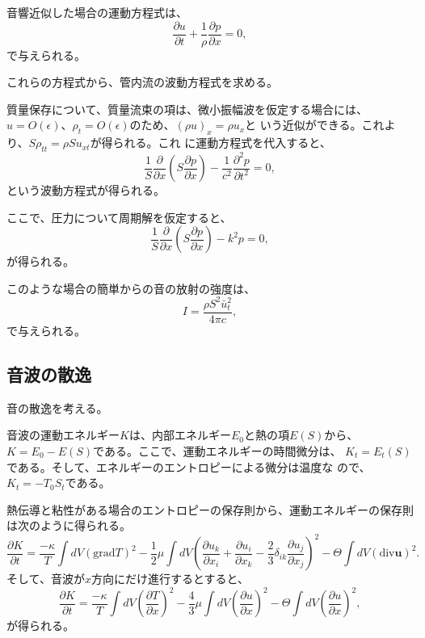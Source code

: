 音響近似した場合の運動方程式は、
\begin{equation}
 \frac{\partial u}{\partial t} 
  + \frac{1}{\rho}\frac{\partial p}{\partial x} = 0,
\end{equation}
で与えられる。

これらの方程式から、管内流の波動方程式を求める。

質量保存について、質量流束の項は、微小振幅波を仮定する場合には、
$u=O(\epsilon)$、$\rho_t = O(\epsilon)$のため、$(\rho u)_x = \rho u_x$と
いう近似ができる。これより、$S\rho_{tt} = \rho S u_{xt}$が得られる。これ
に運動方程式を代入すると、
\begin{equation}
 \frac{1}{S}\frac{\partial}{\partial x}
  \left(S\frac{\partial p}{\partial x}\right)
  -\frac{1}{c^2}\frac{\partial^2p}{\partial t^2} = 0,
\end{equation}
という波動方程式が得られる。

ここで、圧力について周期解を仮定すると、
\begin{equation}
  \frac{1}{S}\frac{\partial}{\partial x}
  \left(S\frac{\partial p}{\partial x}\right)
  -k^2p = 0,
\end{equation}
が得られる。

このような場合の簡単からの音の放射の強度は、
\begin{equation}
 I = \frac{\rho S^2\bar{u}_t^2}{4\pi c},
\end{equation}
で与えられる。

\subsection{音波の散逸}
音の散逸を考える。

音波の運動エネルギー$K$は、内部エネルギー$E_0$と熱の項$E(S)$から、
$K=E_0-E(S)$である。ここで、運動エネルギーの時間微分は、
$K_t =E_t(S)$である。そして、エネルギーのエントロピーによる微分は温度な
ので、$K_t = -T_0S_t$である。

熱伝導と粘性がある場合のエントロピーの保存則から、運動エネルギーの保存則
は次のように得られる。
\begin{equation}
 \frac{\partial K}{\partial t} = 
  \frac{-\kappa}{T}\int dV\left(\text{grad}T\right)^2 -
  \frac{1}{2}\mu\int dV
  \left(\frac{\partial u_k}{\partial x_i} +
   \frac{\partial u_i}{\partial x_k} -
   \frac{2}{3}\delta_{ik}\frac{\partial u_j}{\partial x_j}
  \right)^2 - 
  \Theta\int dV\left(\text{div}\bm{u}\right)^2.
\end{equation}
そして、音波が$x$方向にだけ進行するとすると、
\begin{equation}
 \frac{\partial K}{\partial t} = 
  \frac{-\kappa}{T}\int dV \left(\frac{\partial T}{\partial x}\right)^2 -
  \frac{4}{3}\mu\int dV
  \left(\frac{\partial u}{\partial x}\right)^2 - 
  \Theta\int dV\left(\frac{\partial u}{\partial x}\right)^2,
\end{equation}
が得られる。

